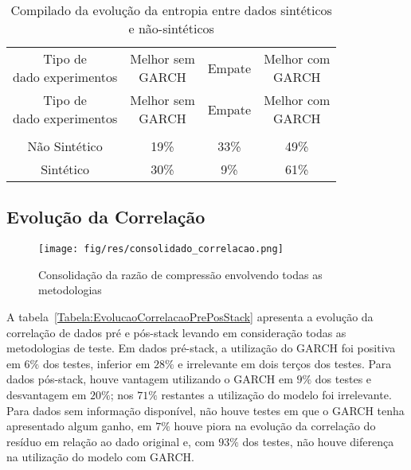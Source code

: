  \begin{center}
\begin{longtable}{cccc}
\toprule
\rowcolor{white}
 \caption{Compilado da evolução da entropia entre dados sintéticos e
 não-sintéticos} \label{Tabela:EvolucaoEntropiaSinteticoOuNaoSintetico} \\
\midrule
\rowcolor{white}
   \specialcell{Tipo de\\dado experimentos} & \specialcell{Melhor sem\\GARCH} &
   Empate & \specialcell{Melhor com\\GARCH} \\
\midrule
\endfirsthead
\midrule
\rowcolor{white}
   \specialcell{Tipo de\\dado experimentos} & \specialcell{Melhor sem\\GARCH} &
   Empate & \specialcell{Melhor com\\GARCH} \\
\toprule
\endhead
\midrule \\ %
\endfoot
\bottomrule
\endlastfoot
    Não Sintético & 19\%  & 33\%  & 49\% \\
    Sintético & 30\%  & 9\%   & 61\% \\
\end{longtable}
\end{center}

 \subsection{Evolução da Correlação}

\begin{figure}[hbtp]
\centering
\texttt{[image: fig/res/consolidado\_correlacao.png]}
\caption[Razão de compressão consolidada]{Consolidação da razão de compressão envolvendo todas as metodologias}
\label{Figura:ConsolidadoRC}
\end{figure}

A tabela~\ref{Tabela:EvolucaoCorrelacaoPrePosStack} apresenta a evolução da
correlação de dados pré e pós-stack levando em consideração todas as
metodologias de teste. Em dados pré-stack, a utilização do GARCH foi positiva em
$6\%$ dos testes, inferior em $28\%$ e irrelevante em dois terços dos testes.
Para dados pós-stack, houve vantagem utilizando o GARCH em $9\%$ dos testes e
desvantagem em $20\%$; nos $71\%$ restantes a utilização do modelo foi
irrelevante. Para dados sem informação disponível, não houve testes em que o
GARCH tenha apresentado algum ganho, em $7\%$ houve piora na evolução da
correlação do resíduo em relação ao dado original e, com $93\%$ dos testes, não
houve diferença na utilização do modelo com GARCH.

